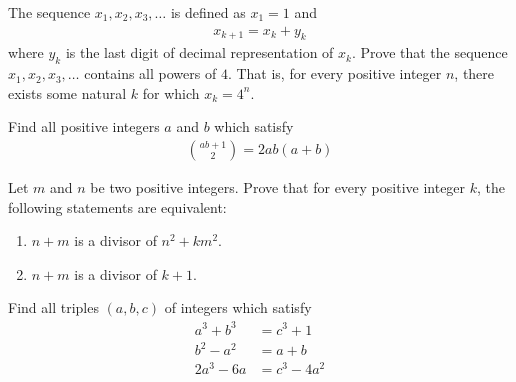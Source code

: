 \documentclass[problems.tex]{subfile}
\begin{document}
	\begin{problem}
		The sequence $x_1, x_2, x_3, \dots$ is defined as $x_1 = 1$ and
		\begin{align*}
			x_{k+1} = x_k + y_k
		\end{align*}
		where $y_k$ is the last digit of decimal representation of $x_k$. Prove that the sequence $x_1, x_2, x_3, \dots$ contains all powers of $4$. That is, for every positive integer $n$, there exists some natural $k$ for which $x_k=4^n$.
	\end{problem}

	\begin{problem}
		Find all positive integers $a$ and $b$ which satisfy
		\begin{align*}
			\binom{ab+1}{2} = 2ab(a+b)
		\end{align*}
	\end{problem}

	\begin{problem}
		Let $m$ and $n$ be two positive integers. Prove that for every positive integer $k$, the following statements are equivalent:
		\begin{enumerate}
			\item $n+m$ is a divisor of $n^2+km^2$.
			\item $n+m$ is a divisor of $k+1$.
		\end{enumerate}
	\end{problem}

	\begin{problem}
		Find all triples $(a, b, c)$ of integers which satisfy
		\begin{align*}
			a^3 + b^3 &= c^3 + 1\\
			b^2 - a^2 &= a + b\\
			2a^3-6a   &= c^3 - 4a^2
		\end{align*}
	\end{problem}
\end{document}
